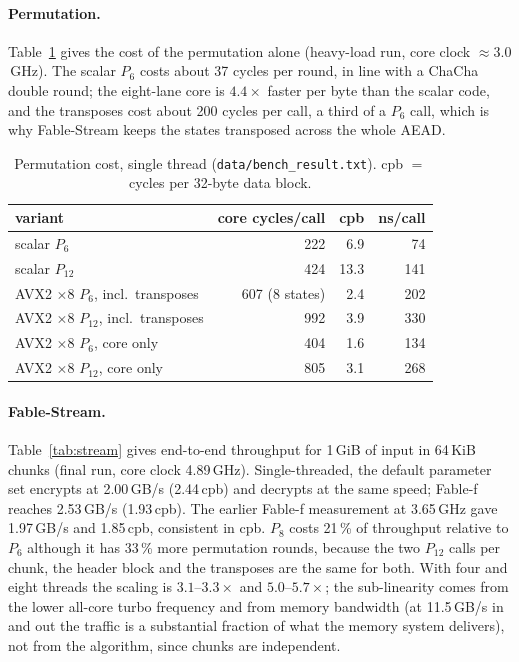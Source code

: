 \documentclass{iacrtrans}
\newcommand{\FableF}{\textsf{Fable-f}\xspace}
\newcommand{\FableStream}{\textsf{Fable-Stream}\xspace}
\newcommand{\ChaCha}{\textsf{ChaCha}\xspace}
\newcommand{\PP}[1]{P_{#1}}
\begin{document}
\paragraph{Permutation.} Table~\ref{tab:perm} gives the cost of the permutation alone (heavy-load run, core clock $\approx 3.0$\,GHz). The scalar $\PP{6}$ costs about 37 cycles per round, in line with a \ChaCha double round; the eight-lane core is $4.4\times$ faster per byte than the scalar code, and the transposes cost about 200 cycles per call, a third of a $\PP{6}$ call, which is why \FableStream keeps the states transposed across the whole AEAD.

\begin{table}[htb]
\centering
\caption{Permutation cost, single thread (\texttt{data/bench\_result.txt}). cpb $=$ cycles per 32-byte data block.}
\label{tab:perm}
\begin{tabular}{lrrr}
\toprule
variant & core cycles/call & cpb & ns/call\\
\midrule
scalar $\PP{6}$ & 222 & 6.9 & 74\\
scalar $\PP{12}$ & 424 & 13.3 & 141\\
AVX2 $\times 8$ $\PP{6}$, incl.\ transposes & 607 (8 states) & 2.4 & 202\\
AVX2 $\times 8$ $\PP{12}$, incl.\ transposes & 992 & 3.9 & 330\\
AVX2 $\times 8$ $\PP{6}$, core only & 404 & 1.6 & 134\\
AVX2 $\times 8$ $\PP{12}$, core only & 805 & 3.1 & 268\\
\bottomrule
\end{tabular}
\end{table}

\paragraph{\FableStream.} Table~\ref{tab:stream} gives end-to-end throughput for 1\,GiB of input in 64\,KiB chunks (final run, core clock 4.89\,GHz). Single-threaded, the default parameter set encrypts at 2.00\,GB/s (2.44\,cpb) and decrypts at the same speed; \FableF reaches 2.53\,GB/s (1.93\,cpb). The earlier \FableF measurement at 3.65\,GHz gave 1.97\,GB/s and 1.85\,cpb, consistent in cpb. $\PP{8}$ costs 21\,\% of throughput relative to $\PP{6}$ although it has 33\,\% more permutation rounds, because the two $\PP{12}$ calls per chunk, the header block and the transposes are the same for both. With four and eight threads the scaling is $3.1$--$3.3\times$ and $5.0$--$5.7\times$; the sub-linearity comes from the lower all-core turbo frequency and from memory bandwidth (at 11.5\,GB/s in and out the traffic is a substantial fraction of what the memory system delivers), not from the algorithm, since chunks are independent.
\end{document}
